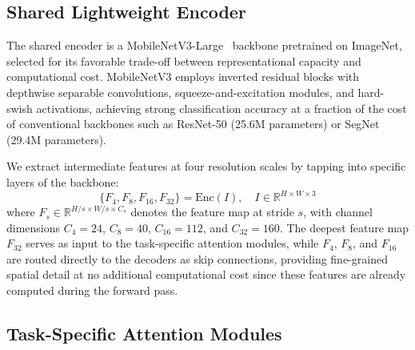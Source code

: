 \documentclass[journal, onecolumn]{IEEEtran}
\begin{document}
\subsection{Shared Lightweight Encoder}

The shared encoder is a MobileNetV3-Large~\cite{howard2019mobilenetv3} backbone pretrained on ImageNet, selected for its favorable trade-off between representational capacity and computational cost. MobileNetV3 employs inverted residual blocks with depthwise separable convolutions, squeeze-and-excitation modules, and hard-swish activations, achieving strong classification accuracy at a fraction of the cost of conventional backbones such as ResNet-50 (25.6M parameters) or SegNet (29.4M parameters).

We extract intermediate features at four resolution scales by tapping into specific layers of the backbone:
\begin{equation}
\{F_4, F_8, F_{16}, F_{32}\} = \text{Enc}(I), \quad I \in \mathbb{R}^{H \times W \times 3}
\end{equation}
where $F_s \in \mathbb{R}^{H/s \times W/s \times C_s}$ denotes the feature map at stride $s$, with channel dimensions $C_4 = 24$, $C_8 = 40$, $C_{16} = 112$, and $C_{32} = 160$. The deepest feature map $F_{32}$ serves as input to the task-specific attention modules, while $F_4$, $F_8$, and $F_{16}$ are routed directly to the decoders as skip connections, providing fine-grained spatial detail at no additional computational cost since these features are already computed during the forward pass.

\subsection{Task-Specific Attention Modules}
\end{document}
